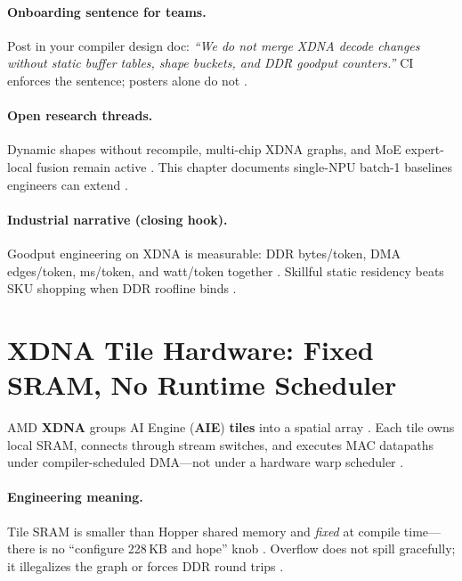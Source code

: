 \paragraph{Onboarding sentence for teams.}
Post in your compiler design doc: \emph{``We do not merge XDNA decode changes without static buffer tables, shape buckets, and DDR goodput counters.''} \citep{yirage2026,taxbreak2026,memoryfloor2026,amd2024xdna}
CI enforces the sentence; posters alone do not \citep{patel2025llminference,chen2020compilerbasedhardw}.

\paragraph{Open research threads.}
Dynamic shapes without recompile, multi-chip XDNA graphs, and MoE expert-local fusion remain active \citep{liu2024deepseekv3,kwon2023vllm,patel2025llminference,yirage2026,amd2024aie}.
This chapter documents single-NPU batch-1 baselines engineers can extend \citep{taxbreak2026,memoryfloor2026,amd2024xdna}.

\paragraph{Industrial narrative (closing hook).}
Goodput engineering on XDNA is measurable: DDR bytes/token, DMA edges/token, ms/token, and watt/token together \citep{taxbreak2026,memoryfloor2026,patel2025llminference,dlbook,amd2024xdna}.
Skillful static residency beats SKU shopping when DDR roofline binds \citep{memoryfloor2026,taxbreak2026,dao2022flashattention,yirage2026,amd2024aie}.


\section{XDNA Tile Hardware: Fixed SRAM, No Runtime Scheduler}
\label{sec:ch05_xdna_tiles}

AMD \textbf{XDNA} groups AI Engine (\textbf{AIE}) \textbf{tiles} into a spatial array \citep{amd2024xdna,amd2024aie}.
Each tile owns local SRAM, connects through stream switches, and executes MAC datapaths under compiler-scheduled DMA---not under a hardware warp scheduler \citep{patel2025llminference}.

\paragraph{Engineering meaning.}
Tile SRAM is smaller than Hopper shared memory and \emph{fixed} at compile time---there is no ``configure 228\,KB and hope'' knob \citep{nvidia2022hopper,amd2024aie}.
Overflow does not spill gracefully; it illegalizes the graph or forces DDR round trips \citep{yirage2026,memoryfloor2026}.

